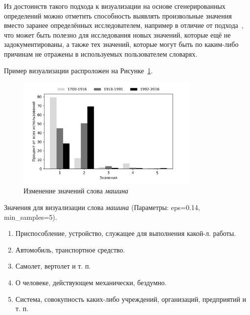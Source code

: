 \documentclass[LI,VKR]{HSEUniversity}
\begin{document}
Из достоинств такого подхода к визуализации на основе сгенерированных определений
можно отметить способность выявлять произвольные значения вместо заранее определённых
исследователем, например в отличие от подхода~\cite{GlossReader}, что может быть полезно для исследования новых значений, которые
ещё не задокументированы, а также тех значений,
которые могут быть по каким-либо причинам не отражены в используемых пользователем словарях.

Пример визуализации распроложен на Рисунке~\ref{fig:Машина_example}.

\begin{figure}[H]
	\centering
	\includegraphics[width=0.8\textwidth]{img/visualizations/mashina_minimal}
	\caption{Изменение значений слова \textit{машина}}
	\label{fig:Машина_example}
\end{figure}

Значения для визуализации слова \textit{машина} (Параметры: eps=0.14, min\_samples=5).

\begin{enumerate}
    \item Приспособление, устройство, служащее для выполнения какой-л. работы.
    \item Автомобиль, транспортное средство.
    \item Самолет, вертолет и т. п.
    \item О человеке, действующем механически, бездумно.
    \item Система, совокупность каких-либо учреждений, организаций, предприятий и т. п.
\end{enumerate}

\end{document}
